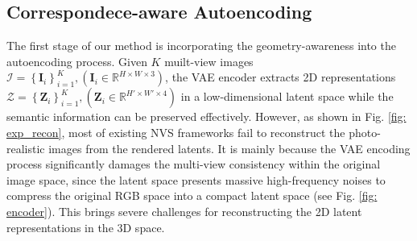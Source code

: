 \subsection{Correspondece-aware Autoencoding}
\label{subsec: Epipolar-aware Autoencoding}
The first stage of our method is incorporating the geometry-awareness into the autoencoding process. Given $K$ muilt-view images $\mathcal{I}=\left\{\boldsymbol{I}_i\right\}_{i=1}^K,\left(\boldsymbol{I}_i \in \mathbb{R}^{H \times W \times 3}\right)$, the VAE encoder extracts 2D representations $\mathcal{Z}=\left\{\boldsymbol{Z}_i\right\}_{i=1}^K,\left(\boldsymbol{Z}_i \in \mathbb{R}^{H' \times W' \times 4}\right)$ in a low-dimensional latent space while the semantic information can be preserved effectively. However, as shown in Fig. \ref{fig: exp_recon}, most of existing NVS frameworks fail to reconstruct the photo-realistic images from the rendered latents.
It is mainly because the VAE encoding process significantly damages the multi-view consistency within the original image space, since the latent space presents massive high-frequency noises to compress the original RGB space into a compact latent space (see Fig. \ref{fig: encoder}). 
This brings severe challenges for reconstructing the 2D latent representations in the 3D space. 




